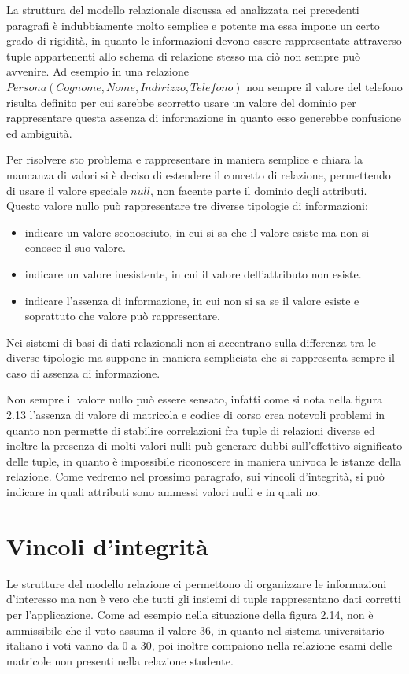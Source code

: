 \documentclass[a4paper,12pt, oneside]{book}
\begin{document}
La struttura del modello relazionale discussa ed analizzata nei precedenti paragrafi è indubbiamente molto
semplice e potente ma essa impone un certo grado di rigidità, in quanto le informazioni devono essere
rappresentate attraverso tuple appartenenti allo schema di relazione stesso ma ciò non sempre può avvenire.\newline
Ad esempio in una relazione $Persona(Cognome, Nome, Indirizzo, Telefono)$ non sempre il valore del telefono
risulta definito per cui sarebbe scorretto usare un valore del dominio per rappresentare questa assenza di
informazione in quanto esso generebbe confusione ed ambiguità.

Per risolvere sto problema e rappresentare in maniera semplice e chiara la mancanza di valori si è deciso di
estendere il concetto di relazione, permettendo di usare il valore speciale $null$, non facente parte il
dominio degli attributi.\newline
Questo valore nullo può rappresentare tre diverse tipologie di informazioni:
\begin{itemize}
    \item indicare un valore sconosciuto, in cui si sa che il valore esiste ma non si conosce il suo valore.
    \item indicare un valore inesistente, in cui il valore dell'attributo non esiste.
    \item indicare l'assenza di informazione, in cui non si sa se il valore esiste e soprattuto che valore può
          rappresentare.
\end{itemize}
Nei sistemi di basi di dati relazionali non si accentrano sulla differenza tra le diverse tipologie ma suppone
in maniera semplicista che si rappresenta sempre il caso di assenza di informazione.

Non sempre il valore nullo può essere sensato, infatti come si nota nella figura 2.13 l'assenza di valore di
matricola e codice di corso crea notevoli problemi in quanto non permette di stabilire correlazioni fra tuple
di relazioni diverse ed inoltre la presenza di molti valori nulli può generare dubbi sull'effettivo
significato delle tuple, in quanto è impossibile riconoscere in maniera univoca le istanze della relazione.\newline
Come vedremo nel prossimo paragrafo, sui vincoli d'integrità, si può indicare in quali attributi sono ammessi
valori nulli e in quali no.

\section{Vincoli d'integrità}
Le strutture del modello relazione ci permettono di organizzare le informazioni d'interesso ma non è vero che
tutti gli insiemi di tuple rappresentano dati corretti per l'applicazione.\newline
Come ad esempio nella situazione della figura 2.14, non è ammissibile che il voto assuma il valore 36, in
quanto nel sistema universitario italiano i voti vanno da 0 a 30, poi inoltre compaiono nella relazione esami
delle matricole non presenti nella relazione studente.
\end{document}
